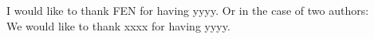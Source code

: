 ﻿%




I would like to thank FEN for having yyyy. Or in the case of two authors:\\
We would like to thank xxxx for having yyyy.


\acknowlegmentssignature